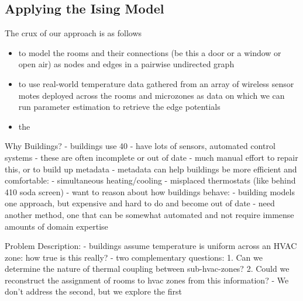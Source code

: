 \subsection{Applying the Ising Model}

The crux of our approach is as follows

\begin{itemize}
\item to model the rooms and their connections (be this a door or a window or open air) as nodes and edges in a pairwise undirected graph
\item to use real-world temperature data gathered from an array of wireless sensor motes deployed across the rooms and microzones as data on which we can run parameter estimation to retrieve the edge potentials
\item the 

\end{itemize}


Why Buildings?
- buildings use 40%
    - have lots of sensors, automated control systems
    - these are often incomplete or out of date
    - much manual effort to repair this, or to build up metadata
    - metadata can help buildings be more efficient and comfortable:
        - simultaneous heating/cooling
        - misplaced thermostats (like behind 410 soda screen)
    - want to reason about how buildings behave:
      - building models one approach, but expensive and hard to do and become out of date
      - need another method, one that can be somewhat automated and not require
        immense amounts of domain expertise

Problem Description:
- buildings assume temperature is uniform across an HVAC zone: how true is this really?
    - two complementary questions:
      1. Can we determine the nature of thermal coupling between sub-hvac-zones?
      2. Could we reconstruct the assignment of rooms to hvac zones from this information?
    - We don't address the second, but we explore the first

\fi
